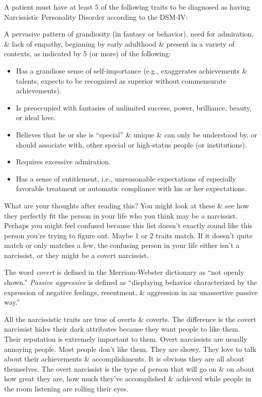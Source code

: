 \documentclass{article}
\numberwithin{equation}{section}
\begin{document}
A patient must have at least 5 of the following traits to be diagnosed as having Narcissistic Personality Disorder according to the DSM-IV:

A pervasive pattern of grandiosity (in fantasy or behavior), need for admiration, \& lack of empathy, beginning by early adulthood \& present in a variety of contexts, as indicated by 5 (or more) of the following:
\begin{itemize}
	\item Has a grandiose sense of self-importance (e.g., exaggerates achievements \& talents, expects to be recognized as superior without commensurate achievements).
	\item Is preoccupied with fantasies of unlimited success, power, brilliance, beauty, or ideal love.
	\item Believes that he or she is ``special'' \& unique \& can only be understood by, or should associate with, other special or high-status people (or institutions).
	\item Requires excessive admiration.
	\item Has a sense of entitlement, i.e., unreasonable expectations of especially favorable treatment or automatic compliance with his or her expectations.
\end{itemize}
What are your thoughts after reading this? You might look at these \& see how they perfectly fit the person in your life who you think may be a narcissist. Perhaps you might feel confused because this list doesn't exactly sound like this person you're trying to figure out. Maybe 1 or 2 traits match. If it doesn't quite match or only matches a few, the confusing person in your life either isn't a narcissist, or they might be a covert narcissist.

The word \textit{covert} is defined in the Merriam-Webster dictionary as ``not openly shown.'' \textit{Passive aggressive} is defined as ``displaying behavior characterized by the expression of negative feelings, resentment, \& aggression in an unassertive passive way.''

All the narcissistic traits are true of overts \& coverts. The difference is the covert narcissist hides their dark attributes because they want people to like them. Their reputation is extremely important to them. Overt narcissists are usually annoying people. Most people don't like them. They are showy. They love to talk about their achievements \& accomplishments. It is obvious they are all about themselves. The overt narcissist is the type of person that will go on \& on about how great they are, how much they've accomplished \& achieved while people in the room listening are rolling their eyes.
\end{document}
